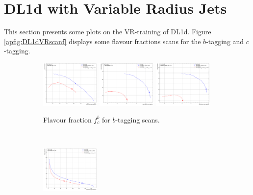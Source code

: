 \section{DL1d with Variable Radius Jets}\label{ap-DL1dVR}
This section presents some plots on the VR-training of DL1d. Figure \ref{apfig:DL1dVRscanf} displays some flavour fractions scans for the $b$-tagging and $c$-tagging. 

\begin{figure}[h!]
  \centering
  \begin{subfigure}[b]{\textwidth}
      \centering
      \includegraphics[width=0.32\textwidth]{Images/FTAG/VRDL1d/scansfraction/thesis_plot_frac/contour_fraction_ttbar_200.pdf}
      \includegraphics[width=0.32\textwidth]{Images/FTAG/VRDL1d/scansfraction/thesis_plot_frac/contour_fraction_zpext_200.pdf}
      \includegraphics[width=0.32\textwidth]{Images/FTAG/VRDL1d/scansfraction/thesis_plot_frac/contour_fraction_graviton_200.pdf}
      \caption{Flavour fraction $f_c^b$ for $b$-tagging scans.} 
      \label{fig:DL1dVRscanfb}
  \end{subfigure}\\
  \begin{subfigure}[b]{\textwidth}
    \centering %
    \includegraphics[width=0.32\textwidth]{Images/FTAG/VRDL1d/scansfraction/thesis_plot_frac_c/contour_fraction_ttbar_2000.pdf}

\end{subfigure}
\end{figure}
